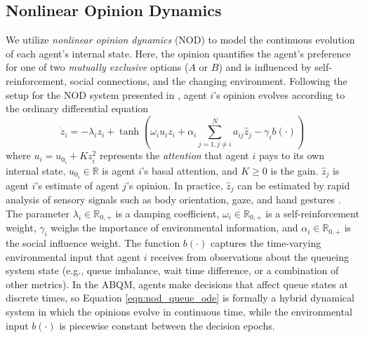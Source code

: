 \documentclass[conference]{IEEEtran}
\begin{document}
\subsection{Nonlinear Opinion Dynamics}
We utilize \emph{nonlinear opinion dynamics} (NOD) \cite{bizyaeva2022nonlinear} to model the continuous evolution of each agent's internal state. 
Here, the opinion quantifies the agent's preference for one of two \emph{mutually exclusive} options ($A$ or $B$) and is influenced by self-reinforcement, social connections, and the changing environment.
Following the setup for the NOD system presented in \cite{bizyaeva2022nonlinear}, 
agent $i$'s opinion evolves according to the ordinary differential equation
\begin{equation}\label{eqn:nod_queue_ode}
   \dot{z}_i = -\lambda_iz_i + \tanh \left(\omega_i u_i  z_i + \alpha_i \sum^N_{j = 1, j\neq i}a_{ij}\hat{z}_j - \gamma_i b(\cdot) \right) 
\end{equation}
where $u_i = u_{0_i} + Kz^2_i$ represents the \emph{attention} that agent $i$ pays to its own internal state, $u_{0_i} \in \mathbb{R}$ is agent $i$'s basal attention, and $K 
\ge 0$ is the gain. $\hat{z}_j$ is agent $i$'s estimate of agent $j$'s opinion. In practice, $\hat{z}_j$ can be estimated by rapid analysis of sensory signals such as body orientation, gaze, and hand gestures \cite{langton2000eyes, csibra2007obsessed}.
The parameter $\lambda_i \in \mathbb{R}_{0,+}$ is a damping coefficient, $\omega_i \in \mathbb{R}_{0,+}$ is a self-reinforcement weight, $\gamma_i$ weighs the importance of environmental information, and $\alpha_i \in \mathbb{R}_{0,+}$ is the social influence weight. The function $b(\cdot)$ captures the  time-varying environmental input that agent $i$ receives from observations about the queueing system state (e.g., queue imbalance, wait time difference, or a combination of other metrics). 
In the ABQM, agents make decisions that affect queue states at discrete times, so Equation \eqref{eqn:nod_queue_ode} is formally a hybrid dynamical system in which the opinions evolve in continuous time, while the environmental input $b(\cdot)$ is piecewise constant between the decision epochs. 
\end{document}
